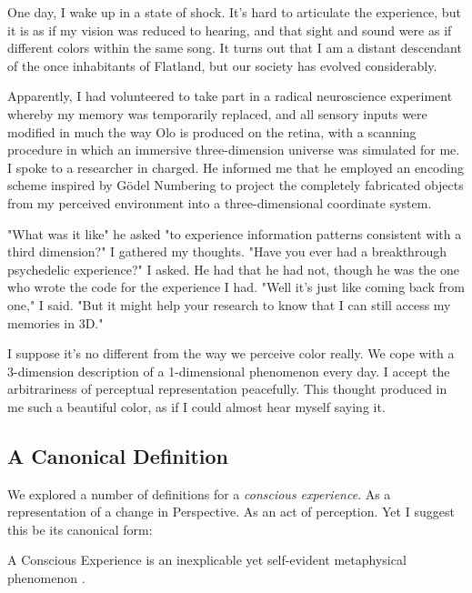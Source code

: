 \documentclass[runningheads]{llncs}
\begin{document}
\begin{aexample}
One day, I wake up in a state of shock. It's hard to articulate the experience, but it is as if my vision was reduced to hearing, and that sight and sound were as if different colors within the same song. It turns out that I am a distant descendant of the once inhabitants of Flatland, but our society has evolved considerably. 

Apparently, I had volunteered to take part in a radical neuroscience experiment whereby my memory was temporarily replaced, and all sensory inputs were modified in much the way Olo is produced on the retina, with a scanning procedure in which an immersive three-dimension universe was simulated for me. I spoke to a researcher in charged. He informed me that he employed an encoding scheme inspired by Gödel Numbering to project the completely fabricated objects from my perceived environment into a three-dimensional coordinate system. 

"What was it like" he asked "to experience information patterns consistent with a third dimension?" I gathered my thoughts. "Have you ever had a breakthrough psychedelic experience?" I asked. He had that he had not, though he was the one who wrote the code for the experience I had. "Well it's just like coming back from one," I said. "But it might help your research to know that I can still access my memories in 3D." 

I suppose it's no different from the way we perceive color really. We cope with a 3-dimension description of a 1-dimensional phenomenon every day. I accept the arbitrariness of perceptual representation peacefully. This thought produced in me such a beautiful color, as if I could almost hear myself saying it.   
\end{aexample}


\subsection{A Canonical Definition}

We explored a number of definitions for a \emph{conscious experience}. As a representation of a change in Perspective. As an act of perception. Yet I suggest this be its canonical form:

\begin{definition}
	A Conscious Experience is an inexplicable yet self-evident metaphysical phenomenon \cite{Formalism}.
\end{definition}
\end{document}
